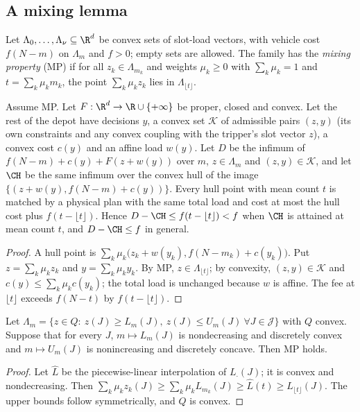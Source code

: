
\subsection*{A mixing lemma}

Let $\Lambda_0,\dots,\Lambda_\nu\subseteq\R^d$ be convex sets of slot-load
vectors, with vehicle cost $f(N-m)$ on $\Lambda_m$ and $f>0$; empty sets are
allowed. The family has the \emph{mixing property} (MP) if for all
$z_k\in\Lambda_{m_k}$ and weights $\mu_k\ge0$ with $\sum_k\mu_k=1$ and
$t=\sum_k\mu_km_k$, the point $\sum_k\mu_kz_k$ lies in $\Lambda_{\lfloor t\rfloor}$.

\begin{lemma}\label{ext:lemA}
Assume MP. Let $F:\R^d\to\R\cup\{+\infty\}$ be proper, closed and convex. Let
the rest of the depot have decisions $y$, a convex set $\mathcal K$ of
admissible pairs $(z,y)$ (its own constraints and any convex coupling with the
tripper's slot vector $z$), a convex cost $c(y)$ and an affine load $w(y)$.
Let $D$ be the infimum of $f(N-m)+c(y)+F(z+w(y))$ over $m$,
$z\in\Lambda_m$ and $(z,y)\in\mathcal K$, and let $\CH$ be the same infimum
over the convex hull of the image $\{(z+w(y),f(N-m)+c(y))\}$. Every hull point
with mean count $t$ is matched by a physical plan with the same total load
and cost at most the hull cost plus $f(t-\lfloor t\rfloor)$. Hence
$D-\CH\le f(t-\lfloor t\rfloor)<f$ when $\CH$ is attained at mean count $t$,
and $D-\CH\le f$ in general.
\end{lemma}
\begin{proof}
A hull point is $\sum_k\mu_k\bigl(z_k+w(y_k),f(N-m_k)+c(y_k)\bigr)$. Put
$z=\sum_k\mu_kz_k$ and $y=\sum_k\mu_ky_k$. By MP, $z\in\Lambda_{\lfloor t\rfloor}$;
by convexity, $(z,y)\in\mathcal K$ and $c(y)\le\sum_k\mu_kc(y_k)$; the total
load is unchanged because $w$ is affine. The fee at $\lfloor t\rfloor$
exceeds $f(N-t)$ by $f(t-\lfloor t\rfloor)$.
\end{proof}

\begin{lemma}\label{ext:lemB}
Let $\Lambda_m=\{z\in Q:\ z(J)\ge L_m(J),\ z(J)\le U_m(J)\ \forall J\in\mathcal J\}$
with $Q$ convex. Suppose that for every $J$, $m\mapsto L_m(J)$ is
nondecreasing and discretely convex and $m\mapsto U_m(J)$ is nonincreasing
and discretely concave. Then MP holds.
\end{lemma}
\begin{proof}
Let $\hat L$ be the piecewise-linear interpolation of $L_\cdot(J)$; it is
convex and nondecreasing. Then
$\sum_k\mu_kz_k(J)\ge\sum_k\mu_kL_{m_k}(J)\ge\hat L(t)\ge L_{\lfloor t\rfloor}(J)$.
The upper bounds follow symmetrically, and $Q$ is convex.
\end{proof}

